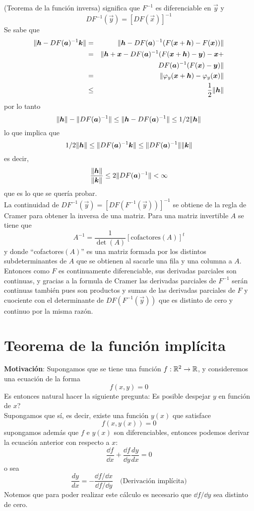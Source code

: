 \begin{demostracion}{\hspace{2mm} (Teorema de la funci\'on inversa)}
significa que $F^{-1}$ es diferenciable en $\vec{y}$ y
\[DF^{-1}(\vec{y})=[DF(\vec{x})]^{-1}\]
Se sabe que
\begin{eqnarray*}
\lVert\boldsymbol{h}-DF(\boldsymbol{a})^{-1}\boldsymbol{k}\rVert & = & \lVert\boldsymbol{h}-DF(\boldsymbol{a})^{-1}(F(\boldsymbol{x}+\boldsymbol{h})-F(\boldsymbol{x}))\rVert \\
                       &=
                       & \lVert\boldsymbol{h}+\boldsymbol{x}-DF(\boldsymbol{a})^{-1}(F(\boldsymbol{x}+\boldsymbol{h})-\boldsymbol{y})-\boldsymbol{x}+\\
& &DF(\boldsymbol{a})^{-1}(F(\boldsymbol{x})-\boldsymbol{y})\rVert\\
                       &=&
                       \lVert\varphi_y(\boldsymbol{x}+\boldsymbol{h})-\varphi_y(\boldsymbol{x})\rVert\\
                       &\leq & \frac{1}{2}\lVert\boldsymbol{h}\rVert
\end{eqnarray*}
 por lo tanto
\[\lVert\boldsymbol{h}\rVert-\lVert DF(\boldsymbol{a})^{-1}\rVert\leq\lVert\boldsymbol{h}-DF(\boldsymbol{a})^{-1}\rVert\leq
1/2\lVert\boldsymbol{h}\rVert\] lo que implica que
\[1/2\lVert\boldsymbol{h}\rVert\leq\lVert DF(\boldsymbol{a})^{-1}\boldsymbol{k}\rVert\leq\lVert DF(\boldsymbol{a})^{-1}\rVert\lVert\boldsymbol{k}\rVert\]
es decir,
\[\frac{\lVert\boldsymbol{h}\rVert}{\lVert\boldsymbol{k}\rVert}\leq2\lVert DF(\boldsymbol{a})^{-1}\rVert <\infty\]
que es lo que se quer\'ia probar.\\ La continuidad de
$DF^{-1}(\vec{y})=[DF(F^{-1}(\vec{y}))]^{-1}$ se obtiene de la regla de Cramer
para obtener la inversa de una matriz. Para una matriz invertible
$A$ se tiene que
\[A^{-1}=\frac{1}{\det(A)}[\text{cofactores} (A)]^t\]
y donde ``cofactores$(A)$'' es una matriz formada por los distintos
subdeterminantes de $A$ que se obtienen al sacarle una fila y una
columna a $A$. Entonces como $F$ es continuamente diferenciable,
sus derivadas parciales son continuas, y gracias a la formula de
Cramer las derivadas parciales de $F^{-1}$ ser\'an continuas
tambi\'en pues son productos y sumas de las derivadas parciales de
$F$ y cuociente con el determinante de $DF(F^{-1}(\vec{y}))$ que es
distinto de cero y continuo por la misma raz\'on.
\end{demostracion}

\section{Teorema de la funci\'on impl\'icita}

\textbf{Motivaci\'on}: Supongamos que se tiene una funci\'on $f:\mathbb{R}^2\to\mathbb{R}$, y
consideremos una ecuaci\'on de la forma
\[f(x,y)=0\]
Es entonces natural hacer la siguiente pregunta: {\textquestiondown}Es posible
despejar $y$ en funci\'on de $x$?
\\Supongamos que s\'i, es
decir, existe una funci\'on $y(x)$ que satisface
\[f(x,y(x))=0\]
supongamos adem\'as que $f$ e $y(x)$ son diferenciables, entonces
podemos derivar la ecuaci\'on anterior con respecto a $x$:
\[\frac{\dd f}{\dd x}+\frac{\dd f}{\dd y}\frac{dy}{dx}=0\]
o sea
\[\frac{dy}{dx}=-\frac{\dd f/\dd x}{\dd f /\dd y}\quad\text{(Derivaci\'on impl\'icita)}\]
Notemos que para poder realizar este c\'alculo es necesario que
$\dd f/\dd y$ sea distinto de cero.

